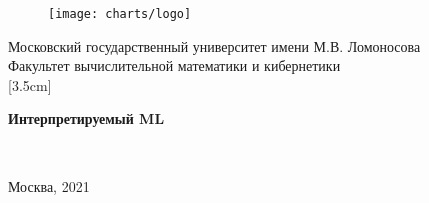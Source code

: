 \begin{center}
    \begin{figure}[h]
        \centering
        \texttt{[image: charts/logo]}
    \end{figure}
    
    \normalsize Московский государственный университет имени М.В. Ломоносова\\
    Факультет вычислительной математики и кибернетики\\
    [3.5cm] 
    
    \large \textbf{Интерпретируемый ML} \\[2.6cm] %
    
    \end{center} 
    
    \begin{flushright}
    
    \\
    \end{flushright}
    
    \hfill \break
    \vfill 
    
    \begin{center} 
    \normalsize{Москва, 2021}\\
    \end{center} 
    
    \thispagestyle{empty}